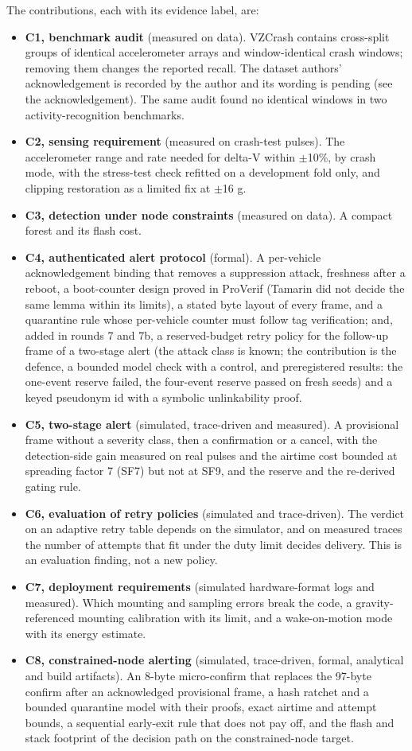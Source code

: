 \documentclass{ieeeaccess}
\begin{document}
The contributions, each with its evidence label, are:
\begin{itemize}
\item \textbf{C1, benchmark audit} (measured on data). VZCrash contains \VzGroups{} cross-split groups of identical accelerometer arrays and window-identical crash windows; removing them changes the reported recall. The dataset authors' acknowledgement is recorded by the author and its wording is pending (see the acknowledgement). The same audit found no identical windows in two activity-recognition benchmarks.
\item \textbf{C2, sensing requirement} (measured on crash-test pulses). The accelerometer range and rate needed for delta-V within $\pm$10\%, by crash mode, with the stress-test check refitted on a development fold only, and clipping restoration as a limited fix at $\pm$16 g.
\item \textbf{C3, detection under node constraints} (measured on data). A compact forest and its flash cost.
\item \textbf{C4, authenticated alert protocol} (formal). A per-vehicle acknowledgement binding that removes a suppression attack, freshness after a reboot, a boot-counter design proved in ProVerif (Tamarin did not decide the same lemma within its limits), a stated byte layout of every frame, and a quarantine rule whose per-vehicle counter must follow tag verification; and, added in rounds 7 and 7b, a reserved-budget retry policy for the follow-up frame of a two-stage alert (the attack class is known; the contribution is the defence, a bounded model check with a control, and preregistered results: the one-event reserve failed, the four-event reserve passed on fresh seeds) and a keyed pseudonym id with a symbolic unlinkability proof.
\item \textbf{C5, two-stage alert} (simulated, trace-driven and measured). A provisional frame without a severity class, then a confirmation or a cancel, with the detection-side gain measured on real pulses and the airtime cost bounded at spreading factor 7 (SF7) but not at SF9, and the reserve and the re-derived gating rule.
\item \textbf{C6, evaluation of retry policies} (simulated and trace-driven). The verdict on an adaptive retry table depends on the simulator, and on measured traces the number of attempts that fit under the duty limit decides delivery. This is an evaluation finding, not a new policy.
\item \textbf{C7, deployment requirements} (simulated hardware-format logs and measured). Which mounting and sampling errors break the code, a gravity-referenced mounting calibration with its limit, and a wake-on-motion mode with its energy estimate.
\item \textbf{C8, constrained-node alerting} (simulated, trace-driven, formal, analytical and build artifacts). An 8-byte micro-confirm that replaces the 97-byte confirm after an acknowledged provisional frame, a hash ratchet and a bounded quarantine model with their proofs, exact airtime and attempt bounds, a sequential early-exit rule that does not pay off, and the flash and stack footprint of the decision path on the constrained-node target.
\end{itemize}
\end{document}
